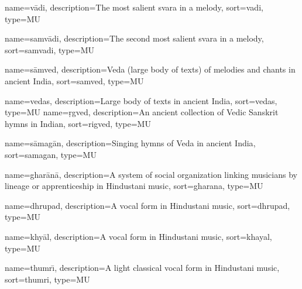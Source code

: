
	
	

	
	
{
	name={v\={a}di},
	description={The most salient svara in a melody},
	sort=vadi,
	type=MU
}

{
	name={samv\={a}di},
	description={The second most salient svara in a melody},
	sort=samvadi,
	type=MU
}

{
	name={s\={a}mved},
	description={Veda (large body of texts) of melodies and chants in ancient India},
	sort=samved,
	type=MU
}

{
	name={vedas},
	description={Large body of texts in ancient India},
	sort=vedas,
	type=MU
}
{
	name={\d{r}gved},
	description={An ancient collection of Vedic Sanskrit hymns in Indian},
	sort=rigved,
	type=MU
}

{
	name={s\={a}mag\={a}n},
	description={Singing hymns of Veda in ancient India},
	sort=samagan,
	type=MU
}

{
	name={ghar\={a}n\={a}},
	description={A system of social organization linking musicians by lineage or apprenticeship in Hindustani music},
	sort=gharana,
	type=MU
}

{
	name={dhrupad},
	description={A vocal form in Hindustani music},
	sort=dhrupad,
	type=MU
}

{
	name={khy\={a}l},
	description={A vocal form in Hindustani music},
	sort=khayal,
	type=MU
}

{
	name={thumr\={\i}},
	description={A light classical vocal form in Hindustani music},
	sort=thumri,
	type=MU
}

